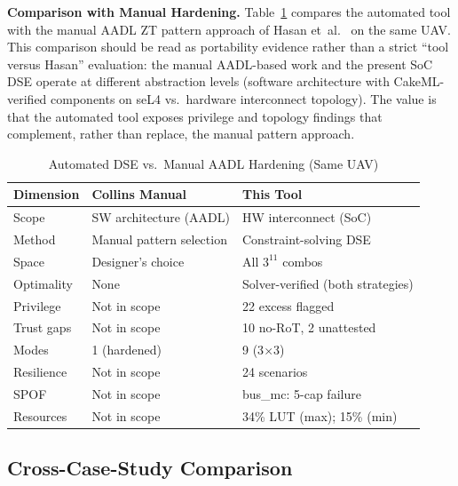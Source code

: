\documentclass[conference]{IEEEtran}
\begin{document}
\textbf{Comparison with Manual Hardening.}
Table~\ref{tab:comparison} compares the automated tool with the manual AADL
ZT pattern approach of Hasan et~al.~\cite{hasan_saecps} on the same UAV.
This comparison should be read as portability evidence rather than a strict
``tool versus Hasan'' evaluation: the manual AADL-based work and the present
SoC DSE operate at different abstraction levels (software architecture with
CakeML-verified components on seL4 vs.\ hardware interconnect topology).
The value is that the automated tool exposes privilege and topology findings
that complement, rather than replace, the manual pattern approach.

\begin{table}[t]
\caption{Automated DSE vs.\ Manual AADL Hardening (Same UAV)}
\label{tab:comparison}
\centering
\scriptsize
\setlength{\tabcolsep}{2pt}
\begin{tabular}{lp{14em}p{14em}}
\toprule
Dimension & Collins Manual~\cite{hasan_saecps} & This Tool \\
\midrule
Scope     & SW architecture (AADL) & HW interconnect (SoC) \\
Method    & Manual pattern selection & Constraint-solving DSE \\
Space     & Designer's choice & All $3^{11}$ combos \\
Optimality& None & Solver-verified (both strategies) \\
Privilege & Not in scope & 22 excess flagged \\
Trust gaps& Not in scope & 10 no-RoT, 2 unattested \\
Modes     & 1 (hardened) & 9 (3$\times$3) \\
Resilience& Not in scope & 24 scenarios \\
SPOF      & Not in scope & bus\_mc: 5-cap failure \\
Resources & Not in scope & 34\% LUT (max); 15\% (min) \\
\bottomrule
\end{tabular}
\end{table}

\subsection{Cross-Case-Study Comparison}
\end{document}
